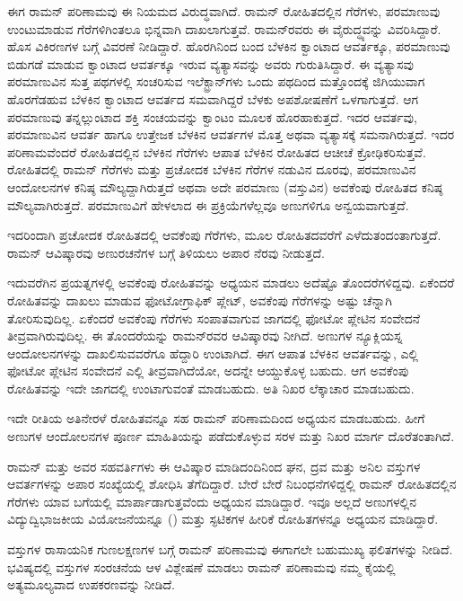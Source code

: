 ಈಗ ರಾಮನ್ ಪರಿಣಾಮವು ಈ ನಿಯಮದ ವಿರುದ್ಧವಾಗಿದೆ. ರಾಮನ್ ರೋಹಿತದಲ್ಲಿನ ಗೆರೆಗಳು, ಪರಮಾಣುವು ಉಂಟುಮಾಡುವ ಗೆರೆಗಳಿಗಿಂತಲೂ ಭಿನ್ನವಾಗಿ ದಾಖಲಾಗುತ್ತವೆ. ರಾಮನ್‍ರವರು ಈ ವೈರುದ್ಧ್ಯವನ್ನು ವಿವರಿಸಿದ್ದಾರೆ. ಹೊಸ ವಿಕಿರಣಗಳ ಬಗ್ಗೆ ವಿವರಣೆ ನೀಡಿದ್ದಾರೆ. ಹೊರಗಿನಿಂದ ಬಂದ ಬೆಳಕಿನ ಕ್ವಾಂಟಾದ ಆವರ್ತಕ್ಕೂ, ಪರಮಾಣುವು ಬಿಡುಗಡೆ ಮಾಡುವ ಕ್ವಾಂಟಾದ ಆವರ್ತಕ್ಕೂ ಇರುವ ವ್ಯತ್ಯಾಸವನ್ನು ಅವರು ಗುರುತಿಸಿದ್ದಾರೆ. ಈ ವ್ಯತ್ಯಾಸವು ಪರಮಾಣುವಿನ ಸುತ್ತ ಪಥಗಳಲ್ಲಿ ಸಂಚರಿಸುವ ಇಲೆಕ್ಟ್ರಾನ್‍ಗಳು ಒಂದು ಪಥದಿಂದ ಮತ್ತೊಂದಕ್ಕೆ ಜಿಗಿಯುವಾಗ ಹೊರಗೆಡಹುವ ಬೆಳಕಿನ ಕ್ವಾಂಟಾದ ಆವರ್ತದ ಸಮವಾಗಿದ್ದರೆ ಬೆಳಕು ಅಪಶೋಷಣೆಗೆ ಒಳಗಾಗುತ್ತದೆ. ಆಗ ಪರಮಾಣುವು ತನ್ನಲ್ಲುಂಟಾದ ಶಕ್ತಿ ಸಂಚಯವನ್ನು ಕ್ವಾಂಟಂ ಮೂಲಕ ಹೊರಹಾಕುತ್ತದೆ. ಇದರ ಆವರ್ತವು, ಪರಮಾಣುವಿನ ಆವರ್ತ ಹಾಗೂ ಉತ್ತೇಜಕ ಬೆಳಕಿನ ಆವರ್ತಗಳ ಮೊತ್ತ ಅಥವಾ ವ್ಯತ್ಯಾಸಕ್ಕೆ ಸಮನಾಗಿರುತ್ತದೆ. ಇದರ ಪರಿಣಾಮವೆಂದರೆ ರೋಹಿತದಲ್ಲಿನ ಬೆಳಕಿನ ಗೆರೆಗಳು ಆಪಾತ ಬೆಳಕಿನ ರೋಹಿತದ ಆಚೀಚೆ ಕ್ರೋಢಿಕರಿಸುತ್ತವೆ. ರೋಹಿತದಲ್ಲಿ ರಾಮನ್ ಗೆರೆಗಳು ಮತ್ತು ಪ್ರಚೋದಕ ಬೆಳಕಿನ ಗೆರೆಗಳ ನಡುವಿನ ದೂರವು, ಪರಮಾಣುವಿನ ಆಂದೋಲನಗಳ ಕನಿಷ್ಠ ಮೌಲ್ಯದ್ದಾಗಿರುತ್ತದೆ ಅಥವಾ ಅದೇ ಪರಮಾಣು (ವಸ್ತುವಿನ) ಅವಕೆಂಪು ರೋಹಿತದ ಕನಿಷ್ಠ ಮೌಲ್ಯವಾಗಿರುತ್ತದೆ. ಪರಮಾಣುವಿಗೆ ಹೇಳಲಾದ ಈ ಪ್ರಕ್ರಿಯೆಗಳೆಲ್ಲವೂ ಅಣುಗಳಿಗೂ ಅನ್ವಯವಾಗುತ್ತದೆ.

ಇದರಿಂದಾಗಿ ಪ್ರಚೋದಕ ರೋಹಿತದಲ್ಲಿ ಆವಕೆಂಪು ಗೆರೆಗಳು, ಮೂಲ ರೋಹಿತದವರೆಗೆ ಎಳೆದುತಂದಂತಾಗುತ್ತದೆ. ರಾಮನ್ ಆವಿಷ್ಕಾರವು ಅಣುರಚನೆಗಳ ಬಗ್ಗೆ ತಿಳಿಯಲು ಅಪಾರ ನೆರವು ನೀಡುತ್ತದೆ.

ಇದುವರೆಗಿನ ಪ್ರಯತ್ನಗಳಲ್ಲಿ ಅವಕೆಂಪು ರೋಹಿತವನ್ನು ಅಧ್ಯಯನ ಮಾಡಲು ಅದೆಷ್ಟೊ ತೊಂದರೆಗಳಿದ್ದವು. ಏಕೆಂದರೆ ರೋಹಿತವನ್ನು ದಾಖಲು ಮಾಡುವ ಫೋಟೋಗ್ರಾಫಿಕ್ ಪ್ಲೇಟ್, ಅವಕೆಂಪು ಗೆರೆಗಳನ್ನು ಅಷ್ಟು ಚೆನ್ನಾಗಿ ತೋರಿಸುವುದಿಲ್ಲ. ಏಕೆಂದರೆ ಅವಕೆಂಪು ಗೆರೆಗಳು ಸಂಪಾತವಾಗುವ ಜಾಗದಲ್ಲಿ ಫೋಟೋ ಪ್ಲೇಟಿನ ಸಂವೇದನೆ ತೀವ್ರವಾಗಿರುವುದಿಲ್ಲ. ಈ ತೊಂದರೆಯನ್ನು ರಾಮನ್‍ರವರ ಆವಿಷ್ಕಾರವು ನೀಗಿದೆ. ಅಣುಗಳ ನ್ಯೂಕ್ಲಿಯಸ್ನ ಆಂದೋಲನಗಳನ್ನು ದಾಖಲಿಸುವವರೆಗೂ ಹೆದ್ದಾರಿ ಉಂಟಾಗಿದೆ. ಈಗ ಆಪಾತ ಬೆಳಕಿನ ಆವರ್ತವನ್ನು, ಎಲ್ಲಿ ಫೋಟೋ ಪ್ಲೇಟಿನ ಸಂವೇದನೆ ಎಲ್ಲಿ ತೀವ್ರವಾಗಿದೆಯೋ, ಅದನ್ನೇ ಆಯ್ದುಕೊಳ್ಳ ಬಹುದು. ಆಗ ಅವಕೆಂಪು ರೋಹಿತವನ್ನು ಇದೇ ಜಾಗದಲ್ಲಿ ಉಂಟಾಗುವಂತೆ ಮಾಡಬಹುದು. ಅತಿ ನಿಖರ ಲೆಕ್ಕಾಚಾರ ಮಾಡಬಹುದು.

ಇದೇ ರೀತಿಯ ಅತಿನೇರಳೆ ರೋಹಿತವನ್ನೂ ಸಹ ರಾಮನ್ ಪರಿಣಾಮದಿಂದ ಅಧ್ಯಯನ ಮಾಡಬಹುದು. ಹೀಗೆ ಅಣುಗಳ ಆಂದೋಲನಗಳ ಪೂರ್ಣ ಮಾಹಿತಿಯನ್ನು ಪಡೆದುಕೊಳ್ಳುವ ಸರಳ ಮತ್ತು ನಿಖರ ಮಾರ್ಗ ದೊರೆತಂತಾಗಿದೆ.

ರಾಮನ್ ಮತ್ತು ಅವರ ಸಹವರ್ತಿಗಳು ಈ ಆವಿಷ್ಕಾರ ಮಾಡಿದಂದಿನಿಂದ ಘನ, ದ್ರವ ಮತ್ತು ಅನಿಲ ವಸ್ತುಗಳ ಆವರ್ತಗಳನ್ನು ಅಪಾರ ಸಂಖ್ಯೆಯಲ್ಲಿ ಶೋಧಿಸಿ ತೆಗೆದಿದ್ದಾರೆ. ಬೇರೆ ಬೇರೆ ನಿಬಂಧನೆಗಳಿದ್ದಲ್ಲಿ ರಾಮನ್ ರೋಹಿತದಲ್ಲಿನ ಗೆರೆಗಳು ಯಾವ ಬಗೆಯಲ್ಲಿ ಮಾರ್ಪಾಡಾಗುತ್ತವೆಂದು ಅಧ್ಯಯನ ಮಾಡಿದ್ದಾರೆ. ಇವೂ ಅಲ್ಲದೆ ಅಣುಗಳಲ್ಲಿನ ವಿದ್ಯುದ್ವಿಭಾಜಕೀಯ ವಿಯೋಜನೆಯನ್ನೂ () ಮತ್ತು ಸ್ಫಟಿಕಗಳ ಹೀರಿಕೆ ರೋಹಿತಗಳನ್ನೂ ಅಧ್ಯಯನ ಮಾಡಿದ್ದಾರೆ.

ವಸ್ತುಗಳ ರಾಸಾಯನಿಕ ಗುಣಲಕ್ಷಣಗಳ ಬಗ್ಗೆ ರಾಮನ್ ಪರಿಣಾಮವು ಈಗಾಗಲೇ ಬಹುಮುಖ್ಯ ಫಲಿತಗಳನ್ನು ನೀಡಿದೆ. ಭವಿಷ್ಯದಲ್ಲಿ ವಸ್ತುಗಳ ಸಂರಚನೆಯ ಆಳ ವಿಶ್ಲೇಷಣೆ ಮಾಡಲು ರಾಮನ್ ಪರಿಣಾಮವು ನಮ್ಮ ಕೈಯಲ್ಲಿ ಅತ್ಯಮೂಲ್ಯವಾದ ಉಪಕರಣವನ್ನು ನೀಡಿದೆ.


